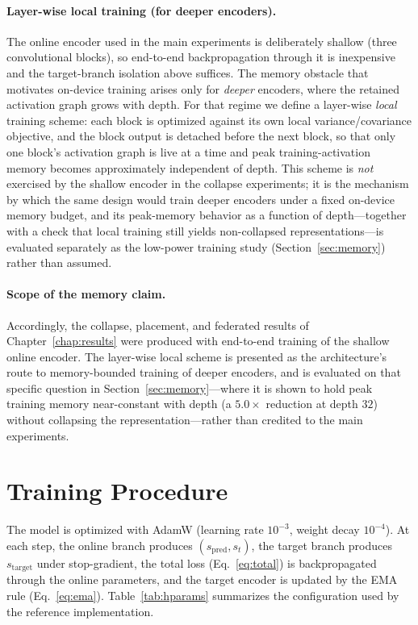 \paragraph{Layer-wise local training (for deeper encoders).}
The online encoder used in the main experiments is deliberately shallow
(three convolutional blocks), so end-to-end backpropagation through it is
inexpensive and the target-branch isolation above suffices. The memory
obstacle that motivates on-device training arises only for \emph{deeper}
encoders, where the retained activation graph grows with depth. For that
regime we define a layer-wise \emph{local} training scheme: each block is
optimized against its own local variance/covariance objective, and the
block output is detached before the next block, so that only one block's
activation graph is live at a time and peak training-activation memory
becomes approximately independent of depth. This scheme is \emph{not}
exercised by the shallow encoder in the collapse experiments; it is the
mechanism by which the same design would train deeper encoders under a
fixed on-device memory budget, and its peak-memory behavior as a function
of depth---together with a check that local training still yields
non-collapsed representations---is evaluated separately as the low-power
training study (Section~\ref{sec:memory}) rather than assumed.

\paragraph{Scope of the memory claim.}
Accordingly, the collapse, placement, and federated results of
Chapter~\ref{chap:results} were produced with end-to-end training of the
shallow online encoder. The layer-wise local scheme is presented as the
architecture's route to memory-bounded training of deeper encoders, and is
evaluated on that specific question in Section~\ref{sec:memory}---where it is
shown to hold peak training memory near-constant with depth (a $5.0\times$
reduction at depth $32$) without collapsing the representation---rather than
credited to the main experiments.

\section{Training Procedure}
The model is optimized with AdamW (learning rate $10^{-3}$, weight decay
$10^{-4}$). At each step, the online branch produces
$(s_{\text{pred}}, s_t)$, the target branch produces $s_{\text{target}}$
under stop-gradient, the total loss (Eq.~\ref{eq:total}) is backpropagated
through the online parameters, and the target encoder is updated by the
EMA rule (Eq.~\ref{eq:ema}). Table~\ref{tab:hparams} summarizes the
configuration used by the reference implementation.

